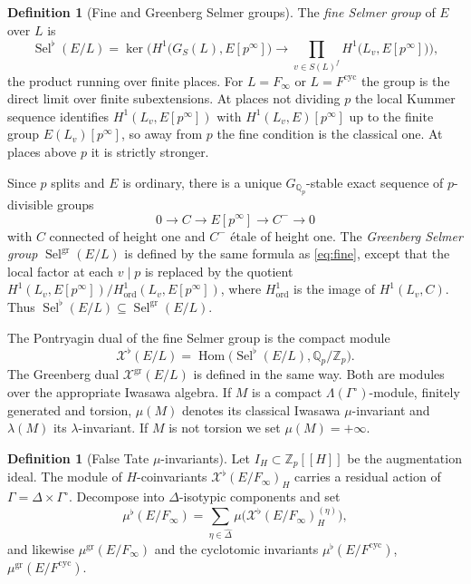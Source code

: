 \documentclass[11pt]{article}
\theoremstyle{definition}
\newtheorem{definition}[theorem]{Definition}
\theoremstyle{remark}
\newcommand{\Z}{\mathbb{Z}}
\newcommand{\Q}{\mathbb{Q}}
\newcommand{\Sel}{\operatorname{Sel}}
\newcommand{\Hom}{\operatorname{Hom}}
\newcommand{\cyc}{\mathrm{cyc}}
\newcommand{\gr}{\mathrm{gr}}
\newcommand{\flatp}{\flat}
\newcommand{\cX}{\mathcal{X}}
\newcommand{\Lam}{\Lambda}
\newcommand{\Gam}{\Gamma^{\circ}}
\begin{document}
\begin{definition}[Fine and Greenberg Selmer groups]
\label{def:sel}
The \emph{fine Selmer group} of \(E\) over \(L\) is
\begin{equation}
\label{eq:fine}
\Sel^{\flatp}(E/L)
 =
\ker\Biggl(
H^1\bigl(G_S(L),E[p^\infty]\bigr)
\longrightarrow
\prod_{v\in S(L)^{f}}
H^1\bigl(L_v,E[p^\infty]\bigr)
\Biggr),
\end{equation}
the product running over finite places. For \(L=F_\infty\) or \(L=F^{\cyc}\) the group is the direct limit over finite subextensions. At places not dividing \(p\) the local Kummer sequence identifies \(H^1(L_v,E[p^\infty])\) with \(H^1(L_v,E)[p^\infty]\) up to the finite group \(E(L_v)[p^\infty]\), so away from \(p\) the fine condition is the classical one. At places above \(p\) it is strictly stronger.

Since \(p\) splits and \(E\) is ordinary, there is a unique \(G_{\Q_p}\)-stable exact sequence of \(p\)-divisible groups
\begin{equation}
\label{eq:filt}
0\to C\to E[p^\infty]\to C^-\to 0
\end{equation}
with \(C\) connected of height one and \(C^-\) \'etale of height one. The \emph{Greenberg Selmer group} \(\Sel^{\gr}(E/L)\) is defined by the same formula as \eqref{eq:fine}, except that the local factor at each \(v\mid p\) is replaced by the quotient \(H^1(L_v,E[p^\infty])/H^1_{\mathrm{ord}}(L_v,E[p^\infty])\), where \(H^1_{\mathrm{ord}}\) is the image of \(H^1(L_v,C)\). Thus \(\Sel^{\flatp}(E/L)\subseteq\Sel^{\gr}(E/L)\).
\end{definition}

The Pontryagin dual of the fine Selmer group is the compact module
\[
\cX^{\flatp}(E/L)=\Hom\bigl(\Sel^{\flatp}(E/L),\Q_p/\Z_p\bigr).
\]
The Greenberg dual \(\cX^{\gr}(E/L)\) is defined in the same way.
Both are modules over the appropriate Iwasawa algebra. If \(M\) is a compact \(\Lam(\Gam)\)-module, finitely generated and torsion, \(\mu(M)\) denotes its classical Iwasawa \(\mu\)-invariant and \(\lambda(M)\) its \(\lambda\)-invariant. If \(M\) is not torsion we set \(\mu(M)=+\infty\).

\begin{definition}[False Tate \(\mu\)-invariants]
\label{def:mu}
Let \(I_H\subset\Z_p[[H]]\) be the augmentation ideal. The module of \(H\)-coinvariants \(\cX^{\flatp}(E/F_\infty)_H\) carries a residual action of \(\Gamma=\Delta\times\Gam\). Decompose into \(\Delta\)-isotypic components and set
\[
\mu^{\flatp}(E/F_\infty)
 =
\sum_{\eta\in\widehat{\Delta}}
\mu\bigl(\cX^{\flatp}(E/F_\infty)_H^{(\eta)}\bigr),
\]
and likewise \(\mu^{\gr}(E/F_\infty)\) and the cyclotomic invariants \(\mu^{\flatp}(E/F^{\cyc})\), \(\mu^{\gr}(E/F^{\cyc})\).
\end{definition}
\end{document}
